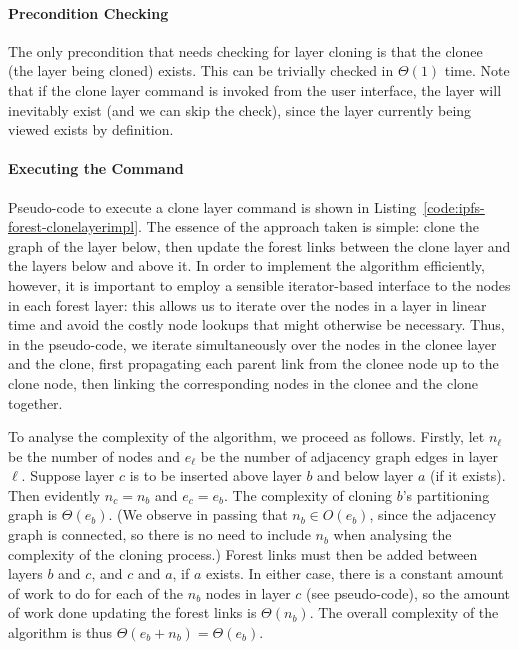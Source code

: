 
\paragraph{Precondition Checking}

The only precondition that needs checking for layer cloning is that the clonee (the layer being cloned) exists. This can be trivially checked in $\Theta(1)$ time. Note that if the clone layer command is invoked from the user interface, the layer will inevitably exist (and we can skip the check), since the layer currently being viewed exists by definition.

\paragraph{Executing the Command}

Pseudo-code to execute a clone layer command is shown in Listing~\ref{code:ipfs-forest-clonelayerimpl}. The essence of the approach taken is simple: clone the graph of the layer below, then update the forest links between the clone layer and the layers below and above it. In order to implement the algorithm efficiently, however, it is important to employ a sensible iterator-based interface to the nodes in each forest layer: this allows us to iterate over the nodes in a layer in linear time and avoid the costly node lookups that might otherwise be necessary. Thus, in the pseudo-code, we iterate simultaneously over the nodes in the clonee layer and the clone, first propagating each parent link from the clonee node up to the clone node, then linking the corresponding nodes in the clonee and the clone together.

To analyse the complexity of the algorithm, we proceed as follows. Firstly, let $n_\ell$ be the number of nodes and $e_\ell$ be the number of adjacency graph edges in layer $\ell$. Suppose layer $c$ is to be inserted above layer $b$ and below layer $a$ (if it exists). Then evidently $n_c = n_b$ and $e_c = e_b$. The complexity of cloning $b$'s partitioning graph is $\Theta(e_b)$. (We observe in passing that $n_b \in O(e_b)$, since the adjacency graph is connected, so there is no need to include $n_b$ when analysing the complexity of the cloning process.) Forest links must then be added between layers $b$ and $c$, and $c$ and $a$, if $a$ exists. In either case, there is a constant amount of work to do for each of the $n_b$ nodes in layer $c$ (see pseudo-code), so the amount of work done updating the forest links is $\Theta(n_b)$. The overall complexity of the algorithm is thus $\Theta(e_b + n_b) = \Theta(e_b)$.

